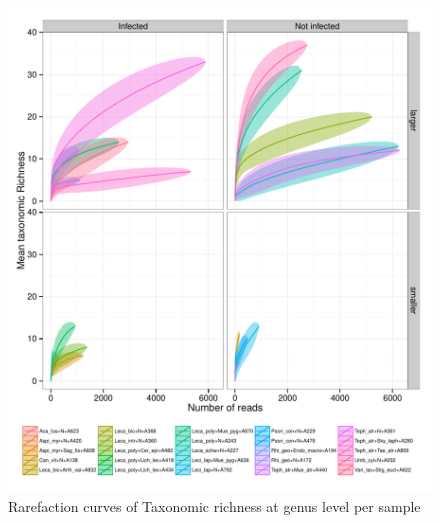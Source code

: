 \documentclass[a4paper, 11]{article}\usepackage[]{graphicx}\usepackage[]{color}
\makeatletter
\def\maxwidth{ %
  \ifdim\Gin@nat@width>\linewidth
    \linewidth
  \else
    \Gin@nat@width
  \fi
}
\newenvironment{knitrout}{}{} %
\makeatother
\begin{document}
\begin{knitrout}
\color{fgcolor}\begin{figure}[H]
\includegraphics[width=\maxwidth]{figure/rarefact_genera-1} \caption[Rarefaction curves of Taxonomic richness at genus level per sample]{Rarefaction curves of Taxonomic richness at genus level per sample}\label{fig:rarefact_genera}
\end{figure}


\end{knitrout}
%
%
\end{document}

